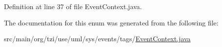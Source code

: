 Definition at line 37 of file Event\-Context.\-java.



The documentation for this enum was generated from the following file\-:\begin{DoxyCompactItemize}
\item 
src/main/org/tzi/use/uml/sys/events/tags/\hyperlink{_event_context_8java}{Event\-Context.\-java}\end{DoxyCompactItemize}
